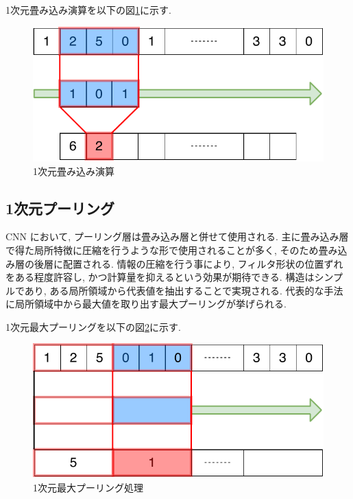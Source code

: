 1次元畳み込み演算を以下の図\ref{fig:1dconv}に示す. 
\begin{figure}[H]
    \begin{center}
    \includegraphics[width=12cm]{eps/1dconv.pdf}
    \caption{1次元畳み込み演算}
    \label{fig:1dconv}
   \end{center}
   \end{figure}

\subsection{1次元プーリング}
CNN において, プーリング層は畳み込み層と併せて使用される. 
主に畳み込み層で得た局所特徴に圧縮を行うような形で使用されることが多く, そのため畳み込み層の後層に配置される. 情報の圧縮を行う事により, フィルタ形状の位置ずれをある程度許容し, かつ計算量を抑えるという効果が期待できる. 
構造はシンプルであり, ある局所領域から代表値を抽出することで実現される. 
代表的な手法に局所領域中から最大値を取り出す最大プーリングが挙げられる. 

1次元最大プーリングを以下の図\ref{fig:1dpool}に示す. 

\begin{figure}[H]
    \begin{center}
    \includegraphics[width=12cm]{eps/1dpool.pdf}
    \caption{1次元最大プーリング処理}
    \label{fig:1dpool}
   \end{center}
   \end{figure}

